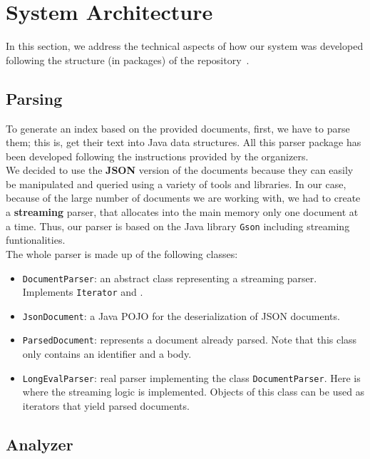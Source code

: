 \section{System Architecture}\label{sec:architecture}

In this section, we address the technical aspects of how our system was developed following the structure (in packages)
of the repository~\cite{jihuming}.

\subsection{Parsing}\label{subsec:parsing}

To generate an index based on the provided documents, first, we have to parse them;
this is, get their text into Java data structures.
All this parser package has been developed following the instructions provided by the organizers.\\

We decided to use the \textbf{JSON} version of the documents because they can easily be manipulated and queried using a
variety of tools and libraries.
In our case, because of the large number of documents we are working with, we had to create a \textbf{streaming} parser,
that allocates into the main memory only one document at a time.
Thus, our parser is based on the Java library \texttt{Gson} including streaming funtionalities.\\

The whole parser is made up of the following classes:
\begin{itemize}
    \item \texttt{DocumentParser}: an abstract class representing a streaming parser.
          Implements \texttt{Iterator} and .
    \item \texttt{JsonDocument}: a Java POJO for the deserialization of JSON documents.
    \item \texttt{ParsedDocument}: represents a document already parsed.
          Note that this class only contains an identifier and a body.
    \item \texttt{LongEvalParser}: real parser implementing the class \texttt{DocumentParser}.
          Here is where the streaming logic is implemented.
          Objects of this class can be used as iterators that yield parsed documents.
\end{itemize}

\subsection{Analyzer}\label{subsec:analyzer}

